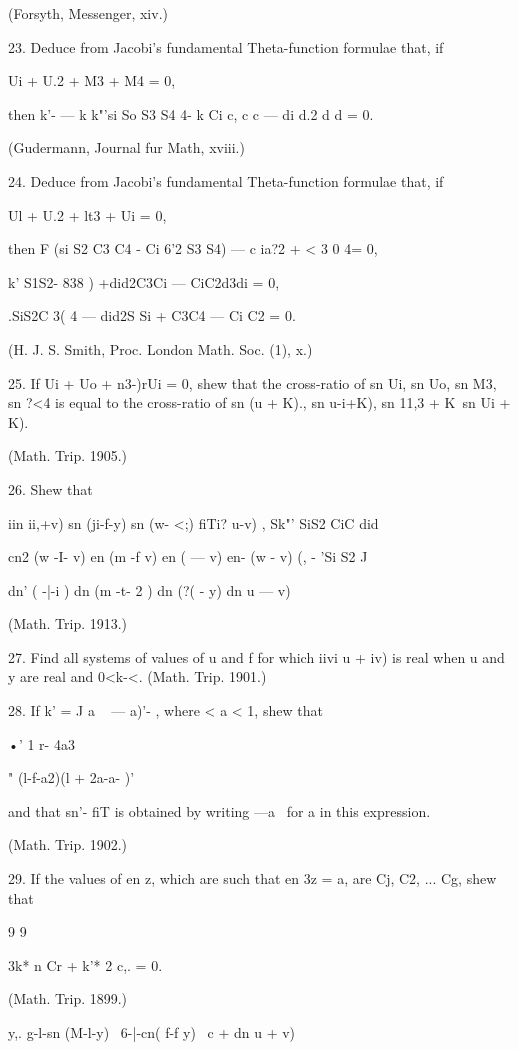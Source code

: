 (Forsyth, Messenger, xiv.) 

23. Deduce from Jacobi's fundamental Theta-function formulae that, if 

Ui + U.2 + M3 + M4 = 0, 

then k'- — k  k"'si So S3 S4 4- k  Ci c, c  c  — di d.2 d  d  = 0. 

(Gudermann, Journal fur Math, xviii.) 

24. Deduce from Jacobi's fundamental Theta-function formulae that, if 

Ul + U.2 + lt3 + Ui = 0, 

then F (si S2 C3 C4 - Ci 6'2 S3 S4) — c ia?2 + < 3 0 4= 0, 

k'   S1S2- 838 ) +did2C3Ci — CiC2d3di = 0, 

.SiS2C 3( 4 — did2S Si + C3C4 — Ci C2 = 0. 

(H. J. S. Smith, Proc. London Math. Soc. (1), x.) 

25. If Ui + Uo + n3-)rUi = 0, shew that the cross-ratio of sn Ui, sn Uo, sn M3, sn ?<4 is equal 
to the cross-ratio of sn (u  + K)., sn  u-i+K), sn  11,3 + K\ sn  Ui + K). 

(Math. Trip. 1905.) 

26. Shew that 

iin  ii,+v) sn (ji-f-y) sn (w- <;) fiTi? u-v) , Sk"' SiS2  CiC did  

cn2 (w -I- v) en (m -f v) en (  — v) en- (w - v) (,   -  'Si S2 J 

dn' ( -|-i ) dn (m -t- 2 ) dn (?( - y) dn  u — v)  

(Math. Trip. 1913.) 

27. Find all systems of values of u and f for which iivi  u + iv) is real when u and y 
are real and 0<k-<.  (Math. Trip. 1901.) 

28. If k' = J  a ~   — a)'- , where < a < 1, shew that 

•' 1 r- 4a3 

 "   (l-f-a2)(l + 2a-a- )' 

and that sn'- fiT is obtained by writing —a~  for a in this expression. 

(Math. Trip. 1902.) 

29. If the values of en z, which are such that en 3z = a, are Cj, C2, ... Cg, shew that 

9 9 

3k* n Cr + k'* 2 c,. = 0. 

(Math. Trip. 1899.) 

y,. g-l-sn (M-l-y) \  6-|-cn( f-f y) \ c + dn u + v) 

